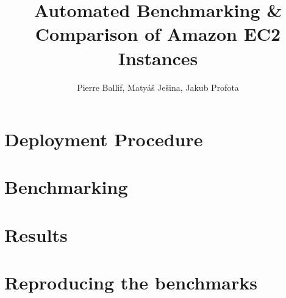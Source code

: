 \documentclass[]{article}
\title{Automated Benchmarking \& Comparison of Amazon EC2 Instances}
\author{Pierre Ballif, Matyáš Ješina, Jakub Profota}
\begin{document}
\begin{comment}
In your report, answer the following questions:
•1) Flask Application Deployment Procedure
•2) Cluster setup using Application Load Balancer
•3) Results of your benchmark
•4) Instructions to run your code

Your assignment will be graded on content as following:
•2 pts: Description of the environment setup and all necessary steps;
•2 pts: Validation of the environment setup;
•6 pts: Results and analysis of your benchmarks;
•3 pts: Automated benchmarking;
•6 pts: Demo;
•1 pts: General presentation and the quality of the report. It is important to
respect the format of the submission. Please use LaTeX!
\end{comment}

\maketitle

\begin{abstract}

\end{abstract}

\section{Deployment Procedure}

\section{Benchmarking}

\section{Results}

\section{Reproducing the benchmarks}
\end{document}
